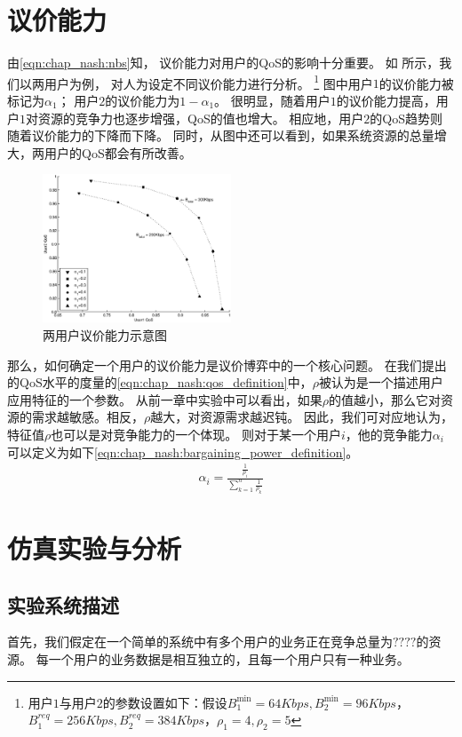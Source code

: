 \section{议价能力}
由\eqref{eqn:chap_nash:nbs}知，
议价能力对用户的QoS的影响十分重要。
如 所示，我们以两用户为例，
对人为设定不同议价能力进行分析。
\footnote{用户$1$与用户$2$的参数设置如下：假设$B_1^{\min}=64Kbps, B_2^{\min}=96Kbps$，$B_1^{req}=256Kbps, B_2^{req}=384Kbps$，$\rho_1=4, \rho_2=5$}
图中用户$1$的议价能力被标记为$\alpha_1$；
用户$2$的议价能力为$1-\alpha_1$。
很明显，随着用户$1$的议价能力提高，用户$1$对资源的竞争力也逐步增强，QoS的值也增大。
相应地，用户$2$的QoS趋势则随着议价能力的下降而下降。
同时，从图中还可以看到，如果系统资源的总量增大，两用户的QoS都会有所改善。
\begin{figure}[!tb] 
    \centering 
    \includegraphics[width = 0.5\textwidth]{chap_nash_two_users_nbs_qos.eps} 
    \caption{两用户议价能力示意图}
    \label{fig:chap_nash:two_users_nbs_qos} 
\end{figure}
那么，如何确定一个用户的议价能力是议价博弈中的一个核心问题。
在我们提出的QoS水平的度量的\eqref{eqn:chap_nash:qos_definition}中，$\rho$被认为是一个描述用户应用特征的一个参数。
从前一章中实验中可以看出，如果$\rho$的值越小，那么它对资源的需求越敏感。相反，$\rho$越大，对资源需求越迟钝。
因此，我们可对应地认为，特征值$\rho$也可以是对竞争能力的一个体现。
则对于某一个用户$i$，他的竞争能力$\alpha_i$可以定义为如下\eqref{eqn:chap_nash:bargaining_power_definition}。
\begin{align}
    \alpha_i = \frac{\frac{1}{\rho_i}}{\sum_{k=1}^n \frac{1}{\rho_k} }
    \label{eqn:chap_nash:bargaining_power_definition}
\end{align}
\section{仿真实验与分析}
\subsection{实验系统描述}
首先，我们假定在一个简单的系统中有多个用户的业务正在竞争总量为$????$的资源。
每一个用户的业务数据是相互独立的，且每一个用户只有一种业务。
